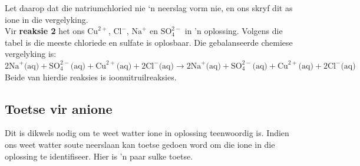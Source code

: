 Let daarop dat die natriumchloried nie ‘n neerslag vorm nie, en ons skryf dit as ione in die vergelyking. \\
Vir \textbf{reaksie 2} het ons ${\text{Cu}}^{2+}$, ${\text{Cl}}^{-}$, ${\text{Na}}^{+}$ en $\text{SO}_{4}^{2-}$ in 'n oplossing. Volgens die tabel is die meeste chloriede en sulfate is oplosbaar. Die gebalanseerde chemiese vergelyking is: \\
$2{\text{Na}}^{+} \text{(aq)} + \text{SO}_{4}^{2-} \text{(aq)} + {\text{Cu}}^{2+} \text{(aq)} + 2{\text{Cl}}^{-} \text{(aq)} \to 2{\text{Na}}^{+} \text{(aq)} + \text{SO}_{4}^{2-} \text{(aq)} + {\text{Cu}}^{2+} \text{(aq)} + 2{\text{Cl}}^{-} \text{(aq)} $
Beide van hierdie reaksies is ioonuitruilreaksies.
	\par
\subsection*{Toetse vir anione}
Dit is dikwels nodig om te weet watter ione in oplossing teenwoordig is. Indien ons weet watter soute neerslaan kan toetse gedoen word om die ione in die oplossing te identifiseer. Hier is 'n paar sulke toetse.
      \label{m38719*uid70}
